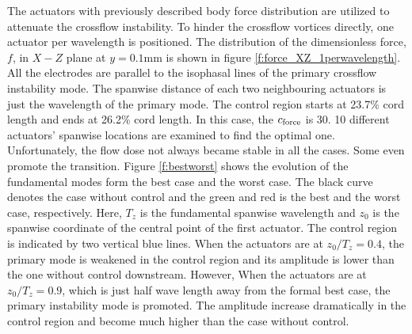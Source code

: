 \documentclass{AIAA}
\begin{document}
The actuators with previously described body force distribution are utilized to attenuate the crossflow instability. To hinder the crossflow vortices directly, one actuator per wavelength is positioned. The distribution of the dimensionless force, $f$, in $X-Z$ plane at $y=0.1$mm is shown in figure \ref{f:force_XZ_1perwavelength}. All the electrodes are parallel to the isophasal lines of the primary crossflow instability mode. The spanwise distance of each two neighbouring actuators is just the wavelength of the primary mode. The control region starts at 23.7\% cord length and ends at 26.2\% cord length. In this case, the $c_{\rm force}$ is 30. 10 different actuators' spanwise locations are examined to find the optimal one. Unfortunately, the flow dose not always became stable in all the cases. Some even promote the transition. Figure \ref{f:bestworst} shows the evolution of the fundamental modes form the best case and the worst case. The black curve denotes the case without control and the green and red is the best and the worst case, respectively. Here, $T_z$ is the fundamental spanwise wavelength and $z_0$ is the spanwise coordinate of the central point of the first actuator. The control region is indicated by two vertical blue lines. When the actuators are at $z_0/T_z=0.4$, the primary mode is weakened in the control region and its amplitude is lower than the one without control downstream. However, When the actuators are at $z_0/T_z=0.9$, which is just half wave length away from the formal best case, the primary instability mode is promoted. The amplitude increase dramatically in the control region and become much higher than the case without control.
\end{document}
